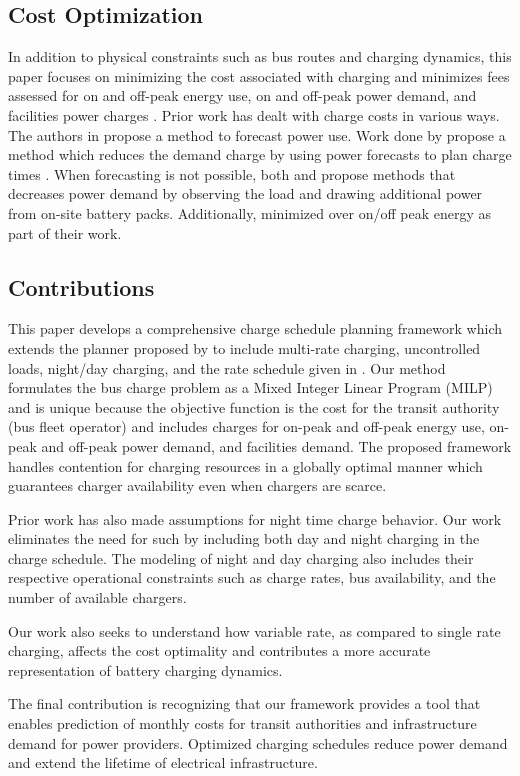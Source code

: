 \subsection{Cost Optimization}
In addition to physical constraints such as bus routes and charging dynamics, this paper focuses on minimizing the cost associated with charging and minimizes fees assessed for on and off-peak energy use, on and off-peak power demand, and facilities power charges \cite{noauthor_rocky_nodate}. Prior work has dealt with charge costs in various ways.  
The authors in \cite{gao_charging_2019} propose a method to forecast power use. Work done by \cite{qin_numerical_2016} propose a method which reduces the demand charge by using power forecasts to plan charge times \cite{gao_charging_2019}.  When forecasting is not possible, both \cite{ojer_development_2020} and \cite{cheng_smart_2020} propose methods that decreases power demand by observing the load and drawing additional power from on-site battery packs. Additionally, \cite{el-taweel_incorporation_2019} minimized over on/off peak energy as part of their work.
\subsection{Contributions}
This paper develops a comprehensive charge schedule planning framework which extends the planner proposed by \cite{whitaker_network_2021} to include multi-rate charging, uncontrolled loads, night/day charging, and the rate schedule given in \cite{noauthor_rocky_nodate}. Our method formulates the bus charge problem as a Mixed Integer Linear Program (MILP) and is unique because the objective function is the cost for the transit authority (bus fleet operator) and includes charges for on-peak and off-peak energy use, on-peak and off-peak power demand, and facilities demand. The proposed framework handles contention for charging resources in a globally optimal manner which guarantees charger availability even when chargers are scarce.
\par Prior work has also made assumptions for night time charge behavior. Our work eliminates the need for such by including both day and night charging in the charge schedule. The modeling of night and day charging also includes their respective operational constraints such as charge rates, bus availability, and the number of available chargers.
\par Our work also seeks to understand how variable rate, as compared to single rate charging, affects the cost optimality and contributes a more accurate representation of battery charging dynamics. 
\par The final contribution is recognizing that our framework provides a tool that enables prediction of monthly costs for transit authorities and infrastructure demand for power providers.  Optimized charging schedules reduce power demand and extend the lifetime of electrical infrastructure.

